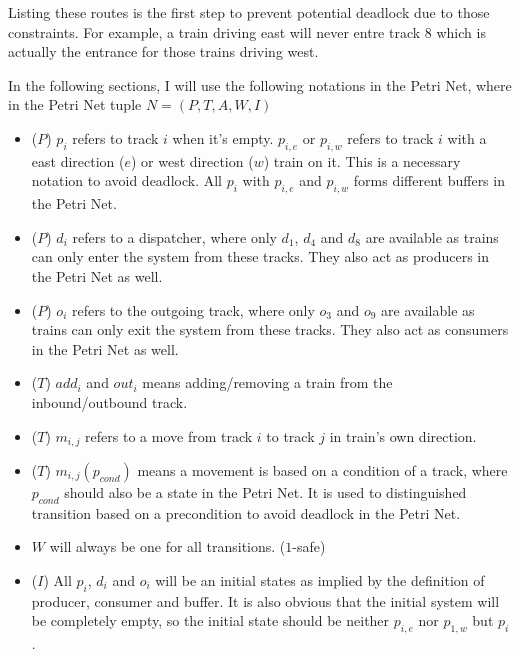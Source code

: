 \documentclass[12pt]{article}
\begin{document}
\begin{itemize}
\end{itemize}

Listing these routes is the first step to prevent potential deadlock due to those constraints. For example, a train driving east will never entre track $8$ which is actually the entrance for those trains driving west.

In the following sections, I will use the following notations in the Petri Net, where in the Petri Net tuple $N=\left(P,T,A,W,I\right)$

\begin{itemize}
  \item ($P$) $p_i$ refers to track $i$ when it's empty. $p_{i,e}$ or $p_{i,w}$ refers to track $i$ with a east direction ($e$) or west direction ($w$) train on it. This is a necessary notation to avoid deadlock.  All $p_i$ with $p_{i,e}$ and $p_{i,w}$ forms different buffers in the Petri Net.
  \item ($P$) $d_i$ refers to a dispatcher, where only $d_1$, $d_4$ and $d_8$ are available as trains can only enter the system from these tracks. They also act as producers in the Petri Net as well.
  \item ($P$) $o_i$ refers to the outgoing track, where only $o_3$ and $o_9$ are available as trains can only exit the system from these tracks. They also act as consumers in the Petri Net as well.
  \item ($T$) ${add_i}$ and ${out_i}$ means adding/removing a train from the inbound/outbound track.
  \item ($T$) $m_{i,j}$ refers to a move from track $i$ to track $j$ in train's own direction.
  \item ($T$) $m_{i,j}\left({p_{cond}}\right)$ means a movement is based on a condition of a track, where $p_{cond}$ should also be a state in the Petri Net. It is used to distinguished transition based on a precondition to avoid deadlock in the Petri Net.
  \item $W$ will always be one for all transitions. ($1$-safe)
  \item ($I$) All $p_i$, $d_i$ and $o_i$ will be an initial states as implied by the definition of producer, consumer and buffer. It is also obvious that the initial system will be completely empty, so the initial state should be neither $p_{i,e}$ nor $p_{1,w}$ but $p_i$.
\end{itemize}
\end{document}
